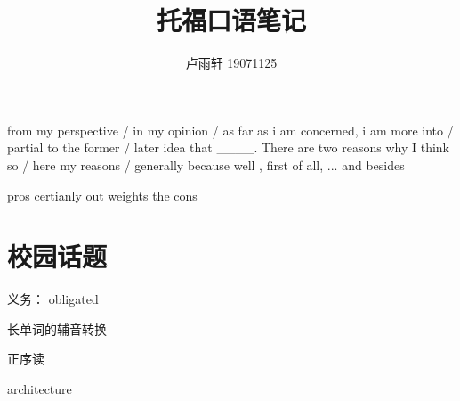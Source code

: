 \documentclass{ctexart}
\title{托福口语笔记}
\author{卢雨轩 19071125}
\begin{document}
\maketitle

from my perspective / in my opinion / as far as i am concerned,  i am more into / partial to the former / later idea that ____.
There are two reasons why I think so / here my reasons / generally because well , first of all, ... and besides

pros certianly out weights the cons

\section{校园话题}
义务： obligated

长单词的辅音转换

正序读

architecture
\begin{outline}

\end{outline}
\end{document}
